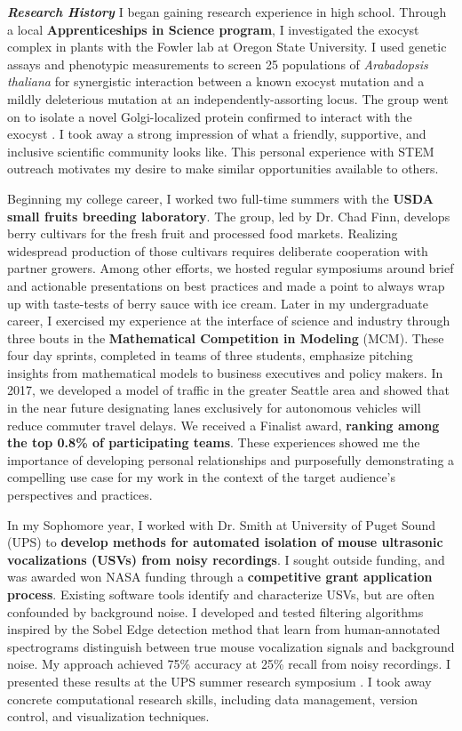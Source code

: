 \textit{\textbf{Research History}}
I began gaining research experience in high school.
Through a local \textbf{Apprenticeships in Science program}, I investigated the exocyst complex in plants with the Fowler lab at Oregon State University.
I used genetic assays and phenotypic measurements to screen 25 populations of \textit{Arabadopsis thaliana} for synergistic interaction between a known exocyst mutation and a mildly deleterious mutation at an independently-assorting locus.
The group went on to isolate a novel Golgi-localized protein confirmed to interact with the exocyst \cite{fowler}.
I took away a strong impression of what a friendly, supportive, and inclusive scientific community looks like.
This personal experience with STEM outreach motivates my desire to make similar opportunities available to others.

Beginning my college career, I worked two full-time summers with the \textbf{USDA small fruits breeding laboratory}.
The group, led by Dr. Chad Finn, develops berry cultivars for the fresh fruit and processed food markets.
Realizing widespread production of those cultivars requires deliberate cooperation with partner growers.
Among other efforts, we hosted regular symposiums around brief and actionable presentations on best practices and made a point to always wrap up with taste-tests of berry sauce with ice cream.
Later in my undergraduate career, I exercised my experience at the interface of science and industry through three bouts in the \textbf{Mathematical Competition in Modeling} (MCM).
These four day sprints, completed in teams of three students, emphasize pitching insights from mathematical models to business executives and policy makers.
In 2017, we developed a model of traffic in the greater Seattle area and showed that in the near future designating lanes exclusively for autonomous vehicles will reduce commuter travel delays.
We received a Finalist award, \textbf{ranking among the top 0.8\% of participating teams}.
These experiences showed me the importance of developing personal relationships and purposefully demonstrating a compelling use case for my work in the context of the target audience's perspectives and practices.%

In my Sophomore year, I worked with Dr. Smith at University of Puget Sound (UPS) to \textbf{develop methods for automated isolation of mouse
ultrasonic vocalizations (USVs) from noisy recordings}.
I sought outside funding, and was awarded won NASA funding through a \textbf{competitive grant application process}.
Existing software tools identify and characterize USVs, but are often confounded by background noise.
I developed and tested filtering algorithms inspired by the Sobel Edge detection method that learn from human-annotated spectrograms distinguish between true mouse vocalization signals and background noise.
My approach achieved 75\% accuracy at 25\% recall from noisy recordings.
I presented these results at the UPS summer research symposium \cite{smith}.
I took away concrete computational research skills, including data management, version control, and visualization techniques.

